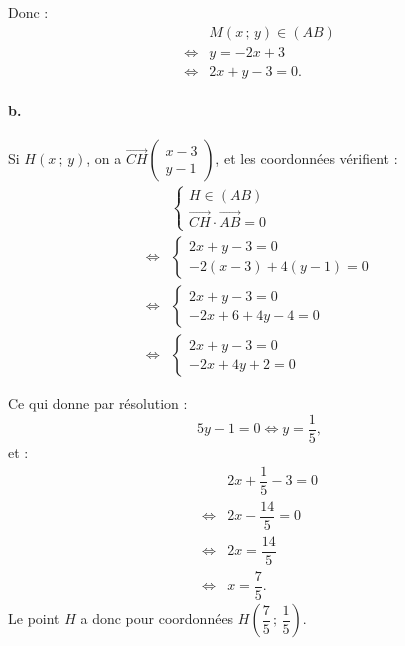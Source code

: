 \documentclass[10pt]{article}
\begin{document}
Donc :
\begin{align*}
&M(x\,;\,y) \in (AB) \\
\iff &y = -2x + 3 \\
\iff &2x + y - 3 = 0.
\end{align*}

\paragraph{b.} Si \(H(x\,;\,y)\), on a \(\overrightarrow{CH} \begin{pmatrix} x - 3 \\ y - 1 \end{pmatrix}\), et les coordonnées vérifient :
\begin{align*}
&\begin{cases} 
H \in (AB) \\ 
\overrightarrow{CH} \cdot \overrightarrow{AB} = 0
\end{cases} \\
\iff &\begin{cases} 
2x + y - 3 = 0 \\ 
-2(x - 3) + 4(y - 1) = 0 
\end{cases} \\
\iff &\begin{cases}
2x + y - 3 = 0 \\
-2x + 6 + 4y - 4 = 0
\end{cases} \\
\iff &\begin{cases}
2x + y - 3 = 0 \\
-2x + 4y + 2 = 0
\end{cases}
\end{align*}

Ce qui donne par résolution :
\[
5y - 1 = 0 \iff y = \dfrac{1}{5},
\]
et :
\begin{align*}
&2x + \dfrac{1}{5} - 3 = 0 \\
\iff &2x - \dfrac{14}{5} = 0 \\
\iff &2x = \dfrac{14}{5} \\
\iff &x = \dfrac{7}{5}.
\end{align*}
Le point \(H\) a donc pour coordonnées \(H\left( \dfrac{7}{5}\,;\,\dfrac{1}{5} \right)\).
\end{document}
